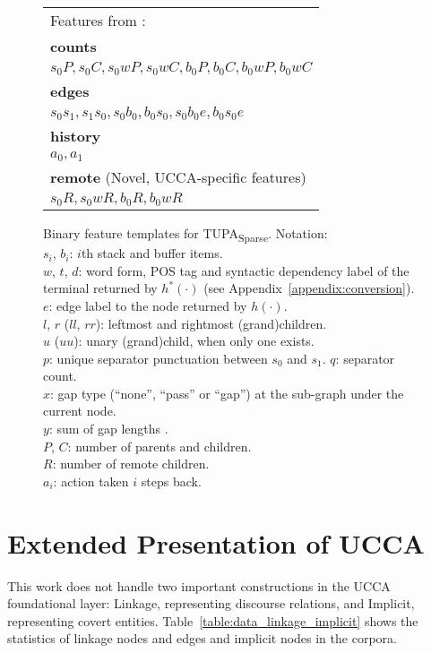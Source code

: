 \documentclass[11pt,a4paper]{article}
\newcommand{\parser}[1]{TUPA\textsubscript{#1}}
\newcommand{\tabref}[1]{Table~\ref{#1}}
\begin{document}
\begin{figure*}
\begin{adjustbox}{margin=3pt,frame}
\begin{tabular}{l}
{\footnotesize Features from \cite{tokgoz2015transition}:} \\
\textbf{counts} \\
$s_0P, s_0C, s_0wP, s_0wC, b_0P, b_0C, b_0wP, b_0wC$ \\
\textbf{edges} \\
$s_0s_1, s_1s_0, s_0b_0, b_0s_0, s_0b_0e, b_0s_0e$ \\
\textbf{history} \\
$a_0, a_1$ \\

\textbf{remote} \footnotesize (Novel, UCCA-specific features) \\
$s_0R, s_0wR, b_0R, b_0wR$
\end{tabular}
\end{adjustbox}
\captionsetup{singlelinecheck=off}
\caption[]{\label{fig:features}
  Binary feature templates for \parser{Sparse}. Notation:\\
  $s_i$, $b_i$: $i$th stack and buffer items.\\
  $w$, $t$, $d$: word form, POS tag and syntactic dependency label of the terminal returned by $h^*(\cdot)$
  (see Appendix~\ref{appendix:conversion}).\\
  $e$: edge label to the node returned by $h(\cdot)$.\\
  $l$, $r$ ($ll$, $rr$): leftmost and rightmost (grand)children.\\
  $u$ ($uu$): unary (grand)child, when only one exists.\\
  $p$: unique separator punctuation between $s_0$ and $s_1$. $q$: separator count.\\
  $x$: gap type (``none'', ``pass'' or ``gap'') at the sub-graph under the current node.\\
  $y$: sum of gap lengths \protect\cite{Maier:Lichte:11}.\\
  $P$, $C$: number of parents and children.\\
  $R$: number of remote children.\\
  $a_i$: action taken $i$ steps back.
}
\end{figure*}

\section{Extended Presentation of UCCA}
\label{appendix:extended_ucca}

This work does not handle two important constructions in the UCCA foundational layer:
Linkage, representing discourse relations, and Implicit, representing covert entities.
\tabref{table:data_linkage_implicit} shows the statistics of linkage nodes and edges and
implicit nodes in the corpora.
\end{document}

